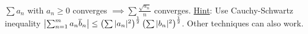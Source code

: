 \documentclass[]{article}
\begin{document}
\begin{example}
	[Ch 3, \#7] $\sum a_n$ with $a_n\geq 0$ converges $\implies \sum \frac{\sqrt{a_n}}{n}$ converges.
	\ul{Hint}: Use Cauchy-Schwartz inequality $\left| \sum_{n=1}^m a_n\overline{b}_n \right| \leq \left( \sum |a_n|^2\right)^\frac{1}{2} \left(\sum |b_n|^2 \right)^\frac{1}{2}$.
	Other techniques can also work.
\end{example}
\end{document}
